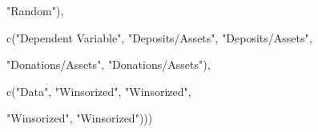 \documentclass[a4paper,nobind]{templates/ociamthesis}
\newenvironment{Shaded}{\begin{snugshade}}{\end{snugshade}}
\newcommand{\FunctionTok}[1]{\textcolor[rgb]{0.00,0.00,0.00}{#1}}
\newcommand{\NormalTok}[1]{#1}
\newcommand{\StringTok}[1]{\textcolor[rgb]{0.31,0.60,0.02}{#1}}
\renewenvironment{Shaded}
{
  \vspace{10pt}%
  \begin{snugshade}%
}{%
  \end{snugshade}%
  \vspace{8pt}%
}
\begin{document}
\begin{landscape}
\begin{Shaded}
\begin{Highlighting}[]
                        \StringTok{"Random"}\NormalTok{), }
                        
                        \FunctionTok{c}\NormalTok{(}\StringTok{"Dependent Variable"}\NormalTok{, }\StringTok{"Deposits/Assets"}\NormalTok{, }\StringTok{"Deposits/Assets"}\NormalTok{,}
                          
                          \StringTok{"Donations/Assets"}\NormalTok{, }\StringTok{"Donations/Assets"}\NormalTok{),}
          
          \FunctionTok{c}\NormalTok{(}\StringTok{"Data"}\NormalTok{, }\StringTok{"Winsorized"}\NormalTok{, }\StringTok{"Winsorized"}\NormalTok{, }
            
            \StringTok{"Winsorized"}\NormalTok{, }\StringTok{"Winsorized"}\NormalTok{)))}
\end{Highlighting}
\end{Shaded}


\end{landscape}
\end{document}
